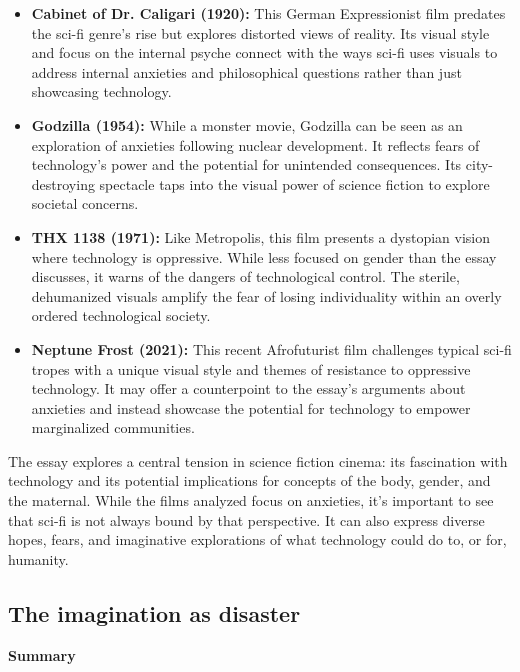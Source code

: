 \documentclass[11pt,fleqn]{book}
\begin{document}
\begin{itemize} 
\item \textbf{Cabinet of Dr. Caligari (1920):}  This German Expressionist film predates the sci-fi genre's rise but explores distorted views of reality.  Its visual style and focus on the internal psyche connect with the ways sci-fi uses visuals to address internal anxieties and philosophical questions rather than just showcasing technology.  

\item \textbf{Godzilla (1954):} While a monster movie, Godzilla can be seen as an exploration of anxieties following nuclear development. It reflects fears of technology's power and the potential for unintended consequences. Its city-destroying spectacle taps into the visual power of science fiction to explore societal concerns. 

\item \textbf{THX 1138 (1971):}  Like Metropolis, this film presents a dystopian vision where technology is oppressive. While less focused on gender than the essay discusses, it warns of the dangers of technological control. The sterile, dehumanized visuals amplify the fear of losing individuality within an overly ordered technological society.  

\item \textbf{Neptune Frost (2021):} This recent Afrofuturist film challenges typical sci-fi tropes with a unique visual style and themes of resistance to oppressive technology. It may offer a counterpoint to the essay's arguments about anxieties and instead showcase the potential for technology to empower marginalized communities.
\end{itemize}

\vspace{5pt} 

The essay explores a central tension in science fiction cinema: its fascination with technology and its potential implications for concepts of the body, gender, and the maternal.  While the films analyzed focus on anxieties, it's important to see that sci-fi is not always bound by that perspective. It can also express diverse hopes, fears, and imaginative explorations of what technology could do to, or for, humanity. 

\subsection{The imagination as disaster}
\textbf{Summary}
\end{document}

